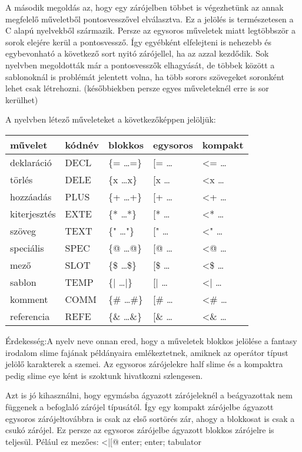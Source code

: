 A második megoldás az, hogy egy zárójelben többet is végezhetünk az annak megfelelő műveletből pontosvesszővel elválasztva. Ez a jelölés is természetesen a C alapú nyelvekből származik. Persze az egysoros műveletek miatt legtöbbször a sorok elejére kerül a pontosvessző. Így egyébként elfelejteni is nehezebb és egybevonható a következő sort nyitó zárójellel, ha az azzal kezdődik. Sok nyelvben megoldották már a pontosvesszők elhagyását, de többek között a sablonoknál is problémát jelentett volna, ha több sorors szövegeket soronként lehet csak létrehozni. (későbbiekben persze egyes műveleteknél erre is sor kerülhet)

A nyelvben létező műveleteket a következőképpen jelöljük:


\begin{center}
  \begin{tabular}{ | l | l | l | l | l | }
    \hline
    művelet		& kódnév 	& blokkos 	& egysoros 	& kompakt	\\ \hline
    deklaráció 	& DECL 		& \{= …=\} 	& [= … 		& <= … 		\\ \hline
    törlés 		& DELE 		& \{x …x\} 	& [x … 		& <x … 		\\ \hline
    hozzáadás	& PLUS 		& \{+ …+\} 	& [+ … 		& <+ … 		\\ \hline
    kiterjesztés& EXTE 		& \{* …*\} 	& [* … 		& <* … 		\\ \hline
    szöveg 		& TEXT 		& \{" …"\} 	& [" … 		& <" … 		\\ \hline
    speciális	& SPEC 		& \{@ …@\} 	& [@ … 		& <@ … 		\\ \hline
    mező 		& SLOT 		& \{\$ …\$\} & [\$ … 	& <\$ … 	\\ \hline
    sablon 		& TEMP 		& \{| …|\} 	& [| … 		& <| … 		\\ \hline
    komment		& COMM 		& \{\# …\#\} & [\# … 	& <\# … 	\\ \hline
    referencia	& REFE 		& \{\& …\&\} & [\& … 	& <\& … 	\\ 
    \hline
  \end{tabular}
\end{center}
	 	 	
Érdekesség:A nyelv neve onnan ered, hogy a műveletek blokkos jelölése a fantasy irodalom slime fajának példányaira emlékeztetnek, amiknek az operátor típust jelölő karakterek a szemei. Az egysoros zárójelekre half slime és a kompaktra pedig slime eye ként is szoktunk hivatkozni szlengesen.

Azt is jó kihasználni, hogy egymásba ágyazott zárójeleknél a beágyazottak nem függenek a befoglaló zárójel típusától. Így egy kompakt zárójelbe ágyazott egysoros zárójeltovábbra is csak az első sortörés zár, ahogy a blokkosat is csak a csukó zárójel. Ez persze az egysoros zárójelbe ágyazott blokkos zárójelre is teljesül. Pélául ez mezőes: <|[@ enter; enter; tabulator

